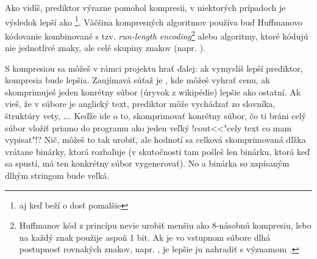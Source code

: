 Ako vidíš, prediktor výrazne pomohol kompresii, v niektorých prípadoch je výsledok
lepší ako \footnote{aj keď beží o dosť pomalšie}. 
Väčšina kompresných algoritmov používa buď Huffmanovo kódovanie
kombinované s tzv. {\em run-length encoding}\footnote{%
  Huffmanov kód z princípu nevie urobiť menšiu ako 8-násobnú kompresiu, lebo na každý
  znak použije aspoň 1 bit. Ak je vo vstupnom súbore dlhá postupnosť rovnakých znakov,
  napr. , je lepšie ju nahradiť  s významom .} alebo algoritmy, ktoré kódujú nie jednotlivé znaky, ale celé skupiny
  znakov (napr. ).


S kompresiou sa môžeš v rámci projektu hrať ďalej: ak vymyslíš lepší prediktor, kompresia
bude lepšia. Zaujímavá súťaž je , kde
môžeš vyhrať cenu, ak skomprimuješ jeden konrétny súbor (úryvok z wikipédie) lepšie ako 
ostatní. Ak vieš, že v súbore je anglický text, prediktor môže vychádzať zo slovníka,
štruktúry vety, \ldots . Keďže ide o to, skomprimovať konrétny súbor, čo ti bráni celý
súbor vložiť priamo do programu ako jeden veľký \prg!cout<<"cely text co mam vypisat"!?
Nič, môžeš to tak urobiť, ale hodnotí sa celková skomprimovaná dľžka vrátane binárky,
ktorá rozbaľuje (v skutočnosti tam pošleš len binárku, ktorá keď sa spustí, má ten konkrétny
súbor vygenerovať). No a binárka so zapísaným dlhým stringom bude veľká. 
